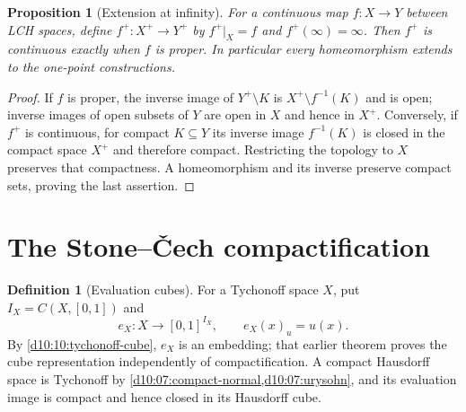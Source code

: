 \documentclass[11pt,oneside,openany]{book}
\newtheorem{proposition}[theorem]{Proposition}
\theoremstyle{definition}
\newtheorem{definition}[theorem]{Definition}
\theoremstyle{remark}
\begin{document}
\begin{proposition}[Extension at infinity]\label{d10:11:proper-infinity}
For a continuous map $f:X\to Y$ between LCH spaces, define $f^+:X^+\to Y^+$ by $f^+|_X=f$ and $f^+(\infty)=\infty$. Then $f^+$ is continuous exactly when $f$ is proper. In particular every homeomorphism extends to the one-point constructions.
\end{proposition}
\begin{proof}
If $f$ is proper, the inverse image of $Y^+\setminus K$ is $X^+\setminus f^{-1}(K)$ and is open; inverse images of open subsets of $Y$ are open in $X$ and hence in $X^+$. Conversely, if $f^+$ is continuous, for compact $K\subseteq Y$ its inverse image $f^{-1}(K)$ is closed in the compact space $X^+$ and therefore compact. Restricting the topology to $X$ preserves that compactness. A homeomorphism and its inverse preserve compact sets, proving the last assertion.
\end{proof}

\section{The Stone--\v Cech compactification}

\begin{definition}[Evaluation cubes]\label{d10:11:evaluation-embedding}
For a Tychonoff space $X$, put $I_X=C(X,[0,1])$ and
\[
 e_X:X\longrightarrow[0,1]^{I_X},\qquad e_X(x)_u=u(x).
\]
By \cref{d10:10:tychonoff-cube}, $e_X$ is an embedding; that earlier theorem proves the cube representation independently of compactification. A compact Hausdorff space is Tychonoff by \cref{d10:07:compact-normal,d10:07:urysohn}, and its evaluation image is compact and hence closed in its Hausdorff cube.
\end{definition}
\end{document}
